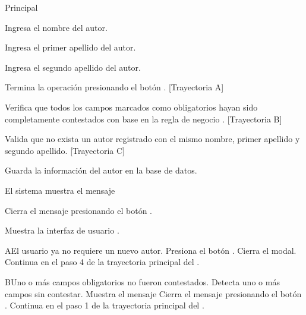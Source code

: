 \begin{UCtrayectoria}{Principal}

    \UCpaso[\UCactor] Ingresa el nombre del autor.

    \UCpaso[\UCactor] Ingresa el primer apellido del autor.

    \UCpaso[\UCactor] Ingresa el segundo apellido del autor.

    \UCpaso[\UCactor] Termina la operación presionando el botón . [Trayectoria A]

    \UCpaso Verifica que todos los campos marcados como obligatorios hayan sido completamente contestados con base en la regla de negocio . [Trayectoria B]

    \UCpaso Valida que no exista un autor registrado con el mismo nombre, primer apellido y segundo apellido. [Trayectoria C]

    \UCpaso Guarda la información del autor en la base de datos.

    \UCpaso El sistema muestra el mensaje 

    \UCpaso[\UCactor] Cierra el mensaje presionando el botón .

    \UCpaso Muestra la interfaz de usuario .
\end{UCtrayectoria}


\begin{UCtrayectoriaA}{A}{El usuario ya no requiere un nuevo autor.}
    \UCpaso[\UCactor] Presiona el botón .
    \UCpaso Cierra el modal.
    \UCpaso Continua en el paso 4 de la trayectoria principal del .
\end{UCtrayectoriaA}


\begin{UCtrayectoriaA}{B}{Uno o más campos obligatorios no fueron contestados.}
    \UCpaso Detecta uno o más campos sin contestar.
    \UCpaso Muestra el mensaje 
    \UCpaso[\UCactor] Cierra el mensaje presionando el botón .
    \UCpaso Continua en el paso 1 de la trayectoria principal del .
\end{UCtrayectoriaA}

